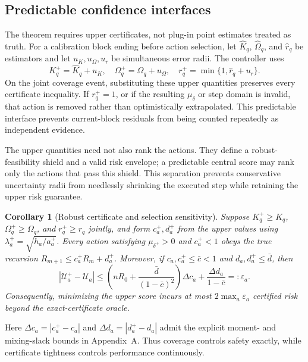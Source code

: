 \documentclass[journal]{IEEEtran}
\newtheorem{corollary}{Corollary}
\begin{document}
\subsection{Predictable confidence interfaces}
The theorem requires upper certificates, not plug-in point estimates treated as truth.
For a calibration block ending before action selection, let $\widehat K_q$, $\widehat\Omega_q$, and $\widehat r_q$ be estimators and let $u_K,u_\Omega,u_r$ be simultaneous error radii.
The controller uses
\begin{equation}
K_q^+=\widehat K_q+u_K,
\quad
\Omega_q^+=\widehat\Omega_q+u_\Omega,
\quad
r_q^+=\min\{1,\widehat r_q+u_r\}.
\label{eq:upper-interfaces}
\end{equation}
On the joint coverage event, substituting these upper quantities preserves every certificate inequality.
If $r_q^+=1$, or if the resulting $\mu_\delta$ or step domain is invalid, that action is removed rather than optimistically extrapolated.
This predictable interface prevents current-block residuals from being counted repeatedly as independent evidence.

The upper quantities need not also rank the actions.
They define a robust-feasibility shield and a valid risk envelope; a predictable central score may rank only the actions that pass this shield.
This separation prevents conservative uncertainty radii from needlessly shrinking the executed step while retaining the upper risk guarantee.

\begin{corollary}[Robust certificate and selection sensitivity]
Suppose $K_q^+\ge K_q$, $\Omega_q^+\ge\Omega_q$, and $r_q^+\ge r_q$ jointly, and form $c_a^+,d_a^+$ from the upper values using $\lambda_a^+=\sqrt{h_a/a_a^+}$.
Every action satisfying $\mu_{\delta^+}>0$ and $c_a^+<1$ obeys the true recursion $R_{m+1}\le c_a^+R_m+d_a^+$.
Moreover, if $c_a,c_a^+\le\bar c<1$ and $d_a,d_a^+\le\bar d$, then
\begin{equation}
|\mathcal U_a^+-\mathcal U_a|
\le
\left(nR_0+\frac{\bar d}{(1-\bar c)^2}\right)\Delta c_a
+\frac{\Delta d_a}{1-\bar c}
=:\varepsilon_a.
\label{eq:robust-score-gap}
\end{equation}
Consequently, minimizing the upper score incurs at most $2\max_a\varepsilon_a$ certified risk beyond the exact-certificate oracle.
\label{cor:robust-certificate}
\end{corollary}

Here $\Delta c_a=|c_a^+-c_a|$ and $\Delta d_a=|d_a^+-d_a|$ admit the explicit moment- and mixing-slack bounds in Appendix~A.
Thus coverage controls safety exactly, while certificate tightness controls performance continuously.
\end{document}
